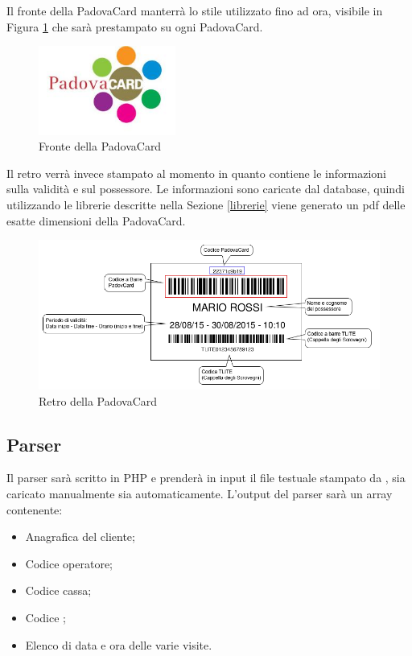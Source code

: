 Il fronte della PadovaCard manterrà lo stile utilizzato fino ad ora, visibile in Figura \ref{stilepadovacard} che sarà prestampato su ogni PadovaCard.

\begin{figure}[H]
\centering
\includegraphics[width=0.4\textwidth]{images/frontepadovacard.JPG}
\caption{Fronte della PadovaCard \label{stilepadovacard}}
\end{figure}

Il retro verrà invece stampato al momento in quanto contiene le informazioni sulla validità e sul possessore.
Le informazioni sono caricate dal database, quindi utilizzando le librerie descritte nella Sezione \ref{librerie} viene generato un pdf delle esatte dimensioni della PadovaCard.

\begin{figure}[H]
\centering
\includegraphics[width=1\textwidth]{images/retropadovacard.png}
\caption{Retro della PadovaCard}
\end{figure}

\subsection{Parser}\label{parser}
Il parser sarà scritto in PHP e prenderà in input il file testuale stampato da \tlite, sia caricato manualmente sia automaticamente. L'output del parser sarà un array contenente:
\begin{itemize}
	\item Anagrafica del cliente;
    \item Codice operatore;
    \item Codice cassa;
    \item Codice \tlite;
    \item Elenco di data e ora delle varie visite.
\end{itemize}

